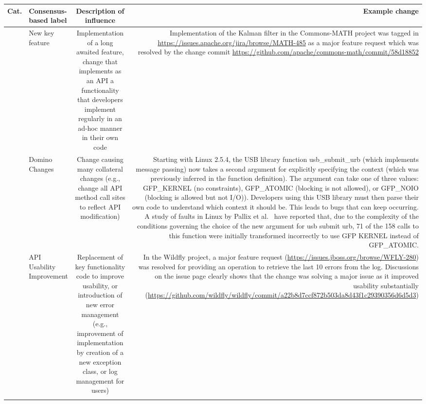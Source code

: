  
\begin{table} [!h]
\scriptsize
	\begin{tabular} {r | l | c | r}
	{\bf Cat.} &{\bf Consensus-based label} & {\bf Description of influence} & {\bf Example change}\\ \hline 
	\multirow{1}{*}[0cm]{\rotatebox[origin=c]{90}{Adaptive/Perfective changes}} & New key feature & \multicolumn{1}{p{4cm}|}{Implementation of a long awaited feature, change that implements as an API a functionality that developers implement regularly in an ad-hoc manner in their own code} & \multicolumn{1}{p{5.5cm}}{Implementation of the Kalman filter in the Commons-MATH project was tagged in {\tiny \url{https://issues.apache.org/jira/browse/MATH-485}} as a major feature request which was resolved by the change commit {\tiny \url{https://github.com/apache/commons-math/commit/58d18852}}\vspace{1cm} }\\ \hline \hline
	\multirow{1}{*}[-1cm]{\rotatebox[origin=c]{90}{Cross-Area changes}}&Domino Changes & \multicolumn{1}{p{4cm}|}{Change causing many collateral changes (e.g., change all API method call sites to reflect API modification)} & \multicolumn{1}{p{5.5cm}}{Starting with Linux 2.5.4, the USB library function usb\_submit\_urb (which implements message passing) now takes a second argument for explicitly specifying the context (which was previously inferred in the function definition). The argument can take one of three values: GFP\_KERNEL (no constraints), GFP\_ATOMIC (blocking is not allowed), or GFP\_NOIO (blocking is allowed but not I/O)). Developers using this USB library must then parse their own code to understand which context it should be. This leads to bugs that can keep occurring. A study of faults in Linux by Pallix et al.~\cite{Palix10Faults} have reported that, due to the complexity of the conditions governing the choice of the new argument for usb submit urb, 71 of the 158 calls to this function were initially transformed incorrectly to use GFP KERNEL instead of GFP\_ATOMIC.}\\ \hline \hline
	\multirow{4}{*}[-3cm]{\rotatebox[origin=r]{90}{Preventive changes}}&API Usability Improvement &\multicolumn{1}{p{4cm}|}{Replacement of key functionality code to improve usability, or introduction of new error management (e.g., improvement of implementation by creation of a new exception class, or log management for users)} & \multicolumn{1}{p{5.5cm}}{In the Wildfly project, a major feature request ({\tiny \url{https://issues.jboss.org/browse/WFLY-280}}) was resolved for providing an operation to retrieve the last 10 errors from the log. Discussions on the issue page clearly shows that the change was solving a major issue as it improved usability substantially ({\tiny \url{https://github.com/wildfly/wildfly/commit/a22b8d7ccf872b503da8d43f1c29390356d6d5d3}}) }\\ \cline{2-4}

\end{tabular}
\end{table}
